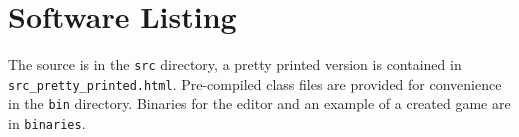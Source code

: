 \section{Software Listing}

The source is in the \texttt{src} directory,  a pretty printed version is contained in \lstinline{src_pretty_printed.html}. Pre-compiled class files are provided for convenience in the \texttt{bin} directory.  Binaries for the editor and an example of a created game are in \texttt{binaries}.
